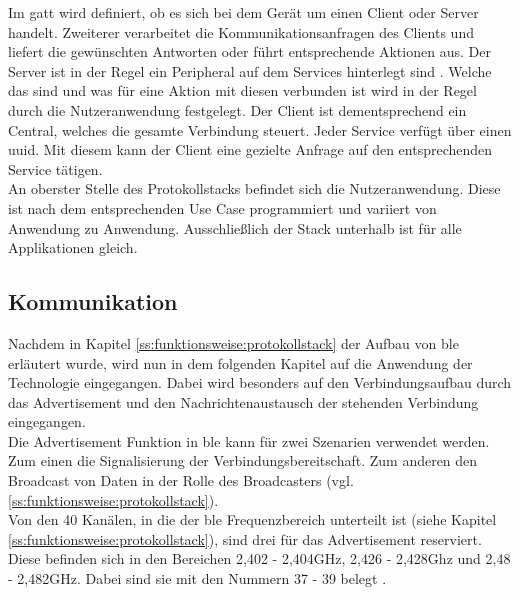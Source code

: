 \noindent Im \ac{gatt} wird definiert, ob es sich bei dem Gerät um einen Client oder Server handelt. Zweiterer verarbeitet die Kommunikationsanfragen des Clients und liefert die gewünschten Antworten oder führt entsprechende Aktionen aus. Der Server ist in der Regel ein Peripheral auf dem Services hinterlegt sind \cite[Seite 30]{Usama17:BBS}. Welche das sind und was für eine Aktion mit diesen verbunden ist wird in der Regel durch die Nutzeranwendung festgelegt. Der Client ist dementsprechend ein Central, welches die gesamte Verbindung steuert. Jeder Service verfügt über einen \ac{uuid}. Mit diesem kann der Client eine gezielte Anfrage auf den entsprechenden Service tätigen.\\    

\noindent An oberster Stelle des Protokollstacks befindet sich die Nutzeranwendung. Diese ist nach dem entsprechenden Use Case programmiert und variiert von Anwendung zu Anwendung. Ausschließlich der Stack unterhalb ist für alle Applikationen gleich.\\

\subsection{Kommunikation}
\label{ss:funktionsweise:kommunkation}

\noindent Nachdem in Kapitel \ref{ss:funktionsweise:protokollstack} der Aufbau von \ac{ble} erläutert wurde, wird nun in dem folgenden Kapitel auf die Anwendung der Technologie eingegangen. Dabei wird besonders auf den Verbindungsaufbau durch das Advertisement und den Nachrichtenaustausch der stehenden Verbindung eingegangen.\\

\noindent Die Advertisement Funktion in \ac{ble} kann für zwei Szenarien verwendet werden. Zum einen die Signalisierung der Verbindungsbereitschaft. Zum anderen den Broadcast von Daten in der Rolle des Broadcasters (vgl. \ref{ss:funktionsweise:protokollstack}).\\

\noindent Von den 40 Kanälen, in die der \ac{ble} Frequenzbereich unterteilt ist (siehe Kapitel \ref{ss:funktionsweise:protokollstack}), sind drei für das Advertisement reserviert. Diese befinden sich in den Bereichen 2,402 - 2,404GHz, 2,426 - 2,428Ghz und 2,48 - 2,482GHz. Dabei sind sie mit den Nummern 37 - 39 belegt \cite[Seite 16]{Townsend14:GSB}.\\

